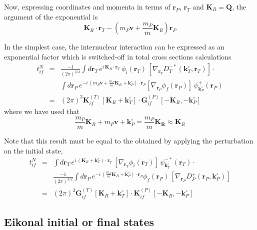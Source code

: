 Now, expressing coordinates and momenta in terms of $\bm{r}_{P}$,
$\bm{r}_{T}$ and $\bm{K}_{R}=\bm{Q}$, the argument of the exponential is
\[
\bm{K}_{R} \cdot \bm{r}_{T} - \left( m_{P} \bm{v} + \frac{m_{P}}{m}
\bm{K}_{R} \right)\bm{r}_{P}
\]


In the simplest case, the internuclear interaction can be expressed as an
exponential factor which is switched-off in total cross sections calculations
\begin{eqnarray}\label{Q:tif-cpt-noNN-f}
t_{if}^{N} &=& \frac{-1}{(2 \pi)^{3/2}}  \int d \bm{r}_{T} \, e^{i
\, \bm{K}_{R} \cdot \bm{r}_T} \, \phi_{i}(\bm{r}_T) \,\left[
\nabla_{\bm{r}_{T}} D^{-*}_{T}(\bm{k}^{\circ}_{T},\bm{r}_T) \right]  \cdot
\nonumber \\
&& \int d \bm{r}_{P} \, e^{- i \, (m_{P} \bm{v} + \frac{m_{P}}{m}
\bm{K}_{R} + \bm{k}_{P}^{\circ}) \cdot \bm{r}_{P}} \left[\nabla_{\bm{r}_{P}}
\phi_{f}(\bm{r}_{P}) \right] \, \psi^{+}_{\bm{k}_{P}^{\circ}} (\bm{r}_{P}) \nonumber
\\
&=& (2 \pi)^{3} \bm{K}^{(T)}_{if}\left[ \bm{K}_{R} + \bm{k}_{T}^{\circ} \right]
\cdot \bm{G}^{(P)}_{if}\left[-\bm{K}_{R},-\bm{k}^{\circ}_{P}\right]
\end{eqnarray}
where we have used that
\[
\frac{m_{P}}{m} \bm{K}_{R} + m_{P}\bm{v} + \bm{k}_{P}^{\circ} = \frac{m_{P}}{m}
\bm{K_{R}} \approx \bm{K}_{R}
\]

Note that this result must be equal to the obtained by applying the
perturbation on the initial state,
%
\begin{eqnarray}\label{Q:tif-cpt-noNN-i}
t_{if}^{N} &=&  \int d \bm{r}_{T} \, e^{i \,(
\bm{K}_{R}+\bm{k}_{T}^{\circ}) \cdot \bm{r}_T} \,\left[ \nabla_{\bm{r}_{T}}
\phi_{i}(\bm{r}_T) \right] \, \psi^{-*}_{\bm{k}^{\circ}_{T}}(\bm{r}_T)   \cdot
\nonumber \\
&&\frac{-1}{(2 \pi)^{3/2}} \int d \bm{r}_{P} \, e^{- i \, \left(
\frac{m_{P}}{m} \bm{K}_{R} + \bm{k}_{P}^{\circ} \right) \cdot \bm{r}_{P}}
\phi_{f}(\bm{r}_{P}) \, \left[\nabla_{\bm{r}_{P}}
D^{+}_{P}(\bm{r}_{P},\bm{k}_{P}^{\circ}) \right]  \nonumber
\\
&=& (2 \pi)^{3} \bm{G}^{(T)}_{if}\left[ \bm{K}_{R} + \bm{k}_{T}^{\circ} \right]
\cdot \bm{K}^{(P)}_{if}\left[-\bm{K}_{R},-\bm{k}^{\circ}_{P}\right]
\end{eqnarray}

\subsection{Eikonal initial or final states}

